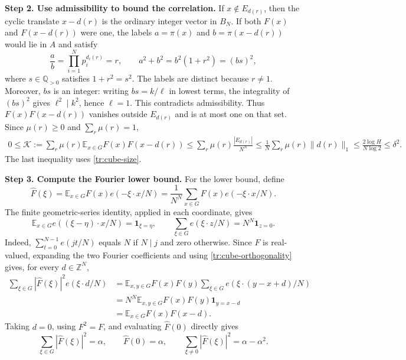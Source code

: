 \documentclass[twoside]{aomart}
\makeatletter
\theoremstyle{paperplain}
\theoremstyle{paperdefinition}
\renewenvironment{proof}[1][\proofname]{\par\pushQED{\qed}%
  \normalfont\topsep6\p@\@plus3\p@\relax\trivlist
  \item[\hskip\labelsep\itshape #1\@addpunct{.}]\ignorespaces
}{\popQED\endtrivlist\@endpefalse}
\newcommand{\E}{\mathbb E}
\newcommand{\Z}{\mathbb Z}
\newcommand{\Q}{\mathbb Q}
\numberwithin{equation}{section}
\makeatother
\begin{document}
\begin{proof}
\par
\medskip
\noindent\textbf{Step 2. Use admissibility to bound the correlation.}
If $x\notin E_{d(r)}$, then the cyclic translate $x-d(r)$ is
the ordinary integer vector in $B_N$. If both $F(x)$ and
$F(x-d(r))$ were one, the labels $a=\pi(x)$ and
$b=\pi(x-d(r))$ would lie in $A$ and satisfy
\begin{equation*}
 \frac ab=\prod_{i=1}^N p_i^{d_i(r)}=r,\qquad
 a^2+b^2=b^2(1+r^2)=(bs)^2,
\end{equation*}
where $s\in\Q_{>0}$ satisfies $1+r^2=s^2$. The labels are distinct
because $r\ne1$. Moreover, $bs$ is an integer: writing $bs=k/\ell$
in lowest terms, the integrality of $(bs)^2$ gives $\ell^2\mid k^2$,
hence $\ell=1$. This contradicts admissibility. Thus
$F(x)F(x-d(r))$ vanishes outside $E_{d(r)}$ and is at most one
on that set. Since $\mu(r)\ge0$ and $\sum_r\mu(r)=1$,
\begin{equation}
 \begin{aligned}
 0\le\mathcal K
 :=\sum_r\mu(r)\E_{x\in G}F(x)F(x-d(r))
 \le\sum_r\mu(r)\frac{|E_{d(r)}|}{N^N}
 \le\frac1N\sum_r\mu(r)\|d(r)\|_1
 \le\frac{2\log H}{N\log2}\le\delta^2.
 \end{aligned}
 \label{tr:upper-correlation}
\end{equation}
The last inequality uses \eqref{tr:cube-size}.

\par
\medskip
\noindent\textbf{Step 3. Compute the Fourier lower bound.}
For the lower bound, define
\begin{equation*}
 \widehat F(\xi)=\E_{x\in G}F(x)e(-\xi\cdot x/N)
               =\frac1{N^N}\sum_{x\in G}F(x)e(-\xi\cdot x/N).
\end{equation*}
The finite geometric-series identity, applied in each coordinate,
gives
\begin{equation}
 \E_{x\in G}e((\xi-\eta)\cdot x/N)=\mathbf1_{\xi=\eta},
 \qquad
 \sum_{\xi\in G}e(\xi\cdot z/N)=N^N\mathbf1_{z=0}.
 \label{tr:cube-orthogonality}
\end{equation}
Indeed, $\sum_{t=0}^{N-1}e(jt/N)$ equals $N$ if $N\mid j$ and
zero otherwise. Since $F$ is real-valued, expanding the two Fourier
coefficients and using \eqref{tr:cube-orthogonality} gives, for every
$d\in\Z^N$,
\begin{equation*}
 \begin{aligned}
 \sum_{\xi\in G}|\widehat F(\xi)|^2e(\xi\cdot d/N)
 &=\E_{x,y\in G}F(x)F(y)
       \sum_{\xi\in G}e(\xi\cdot(y-x+d)/N)\\
 &=N^N\E_{x,y\in G}F(x)F(y)\mathbf1_{y=x-d}\\
 &=\E_{x\in G}F(x)F(x-d).
 \end{aligned}
\end{equation*}
Taking $d=0$, using $F^2=F$, and evaluating $\widehat F(0)$
directly gives
\begin{equation}
 \sum_{\xi\in G}|\widehat F(\xi)|^2=\alpha,\qquad
 \widehat F(0)=\alpha,\qquad
 \sum_{\xi\ne0}|\widehat F(\xi)|^2=\alpha-\alpha^2.
 \label{tr:transfer-fourier-mass}
\end{equation}


\end{proof}
\end{document}
